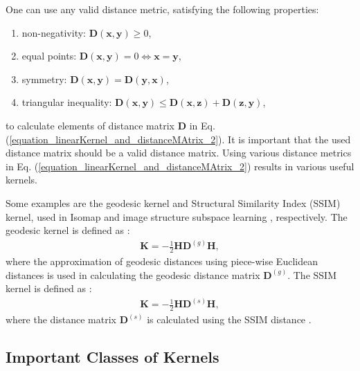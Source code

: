 \documentclass[lang=cn,10pt]{gorgeousnbook}
\numberwithin{equation}{section}%
\numberwithin{figure}{section}%
\begin{document}
\begin{remark}
One can use any valid distance metric, satisfying the following properties:
\begin{enumerate}[topsep=0pt,itemsep=-1ex,partopsep=1ex,parsep=1ex]
\item non-negativity: $\boldsymbol{D}(\boldsymbol{x}, \boldsymbol{y}) \geq 0$, 
\item equal points: $\boldsymbol{D}(\boldsymbol{x}, \boldsymbol{y}) = 0 \iff \boldsymbol{x} = \boldsymbol{y}$, 
\item symmetry: $\boldsymbol{D}(\boldsymbol{x}, \boldsymbol{y}) = \boldsymbol{D}(\boldsymbol{y}, \boldsymbol{x})$, 
\item triangular inequality: $\boldsymbol{D}(\boldsymbol{x}, \boldsymbol{y}) \leq \boldsymbol{D}(\boldsymbol{x}, \boldsymbol{z})\! + \boldsymbol{D}(\boldsymbol{z}, \boldsymbol{y})$,
\end{enumerate}
to calculate elements of distance matrix $\boldsymbol{D}$ in Eq. (\ref{equation_linearKernel_and_distanceMAtrix_2}). It is important that the used distance matrix should be a valid distance matrix. Using various distance metrics in Eq. (\ref{equation_linearKernel_and_distanceMAtrix_2}) results in various useful kernels.
\end{remark}

Some examples are the geodesic kernel and Structural Similarity Index (SSIM) kernel, used in Isomap \cite{tenenbaum2000global} and image structure subspace learning \cite{ghojogh2019image}, respectively. 
The geodesic kernel is defined as \cite{tenenbaum2000global,ghojogh2020multidimensional}:
\begin{align}
\boldsymbol{K} = -\frac{1}{2} \boldsymbol{H}\boldsymbol{D}^{(g)}\boldsymbol{H},
\end{align}
where the approximation of geodesic distances using piece-wise Euclidean distances is used in calculating the geodesic distance matrix $\boldsymbol{D}^{(g)}$. 
The SSIM kernel is defined as \cite{ghojogh2019image}:
\begin{align}
\boldsymbol{K} = -\frac{1}{2} \boldsymbol{H} \boldsymbol{D}^{(s)} \boldsymbol{H},
\end{align}
where the distance matrix $\boldsymbol{D}^{(s)}$ is calculated using the SSIM distance \cite{brunet2011mathematical}. 


\subsection{Important Classes of Kernels}\label{section_universal_characteristic_kernels}
\end{document}
